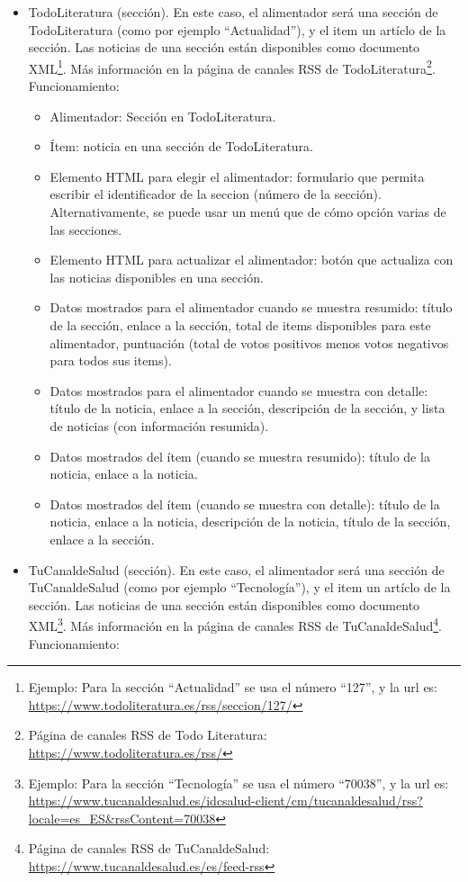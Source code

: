 \begin{itemize}
\item TodoLiteratura (sección). En este caso, el alimentador será una sección de TodoLiteratura (como por ejemplo ``Actualidad''), y el item un artíclo de la sección. Las noticias de una sección están disponibles como documento XML\footnote{Ejemplo: Para la sección ``Actualidad'' se usa el número ``127'', y la url es: \\ \url{https://www.todoliteratura.es/rss/seccion/127/}}. Más información en la página de canales RSS de TodoLiteratura\footnote{Página de canales RSS de Todo Literatura: \\ \url{https://www.todoliteratura.es/rss/}}. Funcionamiento:

  \begin{itemize}
  \item Alimentador: Sección en TodoLiteratura.
  \item Ítem: noticia en una sección de TodoLiteratura.
  \item Elemento HTML para elegir el alimentador: formulario que permita escribir el identificador de la seccion (número de la sección). Alternativamente, se puede usar un menú que de cómo opción varias de las secciones.
  \item Elemento HTML para actualizar el alimentador: botón que actualiza con las noticias disponibles en una sección.
  \item Datos mostrados para el alimentador cuando se muestra resumido: título de la sección, enlace a la sección, total de items disponibles para este alimentador, puntuación (total de votos positivos menos votos negativos para todos sus items).
  \item Datos mostrados para el alimentador cuando se muestra con detalle: título de la noticia, enlace a la sección, descripción de la sección, y lista de noticias (con información resumida).
  \item Datos mostrados del ítem (cuando se muestra resumido): título de la noticia, enlace a la noticia.
  \item Datos mostrados del ítem (cuando se muestra con detalle): título de la noticia, enlace a la noticia, descripción de la noticia, título de la sección, enlace a la sección.
  \end{itemize}

\item TuCanaldeSalud (sección). En este caso, el alimentador será una sección de TuCanaldeSalud (como por ejemplo ``Tecnología''), y el item un artíclo de la sección. Las noticias de una sección están disponibles como documento XML\footnote{Ejemplo: Para la sección ``Tecnología'' se usa el número ``70038'', y la url es: \\ \url{https://www.tucanaldesalud.es/idcsalud-client/cm/tucanaldesalud/rss?locale=es_ES&rssContent=70038}}. Más información en la página de canales RSS de TuCanaldeSalud\footnote{Página de canales RSS de TuCanaldeSalud: \\ \url{https://www.tucanaldesalud.es/es/feed-rss}}. Funcionamiento:


\end{itemize}
